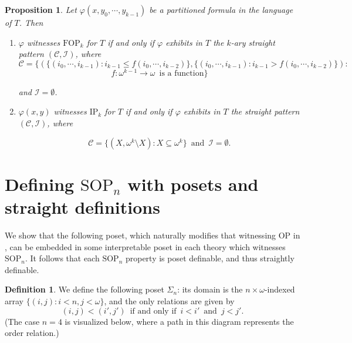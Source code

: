 \documentclass{article}
\newcommand{\calC}{\mathcal{C}}
\newcommand{\calI}{\mathcal{I}}
\newcommand{\SOP}{\text{SOP}}
\newcommand{\SOPn}{$\text{SOP}_n$}
\newcommand{\IFF}{\enspace\text{if and only if}\enspace}
\newcommand{\vphi}{\varphi}
\newtheorem{proposition}{Proposition}
\theoremstyle{definition}
\newtheorem{definition}{Definition}
\theoremstyle{definition}
\theoremstyle{definition}
\begin{document}
\begin{proposition}\label{higher arity straight pattern examples proposition}
    Let $\vphi(x,y_0,\dotsm, y_{k-1})$ be a partitioned formula in the language of $T$. Then
    \begin{enumerate}
        \item $\vphi$ witnesses $\mathrm{FOP}_k$ for $T$ if and only if $\vphi$ exhibits in $T$ the $k$-ary straight pattern $(\calC,\calI)$, where  
        \[\calC=\{(\{(i_0,\dotsm, i_{k-1})\colon i_{k-1}\leq f(i_0,\dotsm, i_{k-2})\},\{(i_0,\dotsm, i_{k-1})\colon i_{k-1}> f(i_0,\dotsm, i_{k-2})\})\colon\]
        \[ f\colon\omega^{k-1}\to\omega\enspace\text{is a function}\}\]
        
        and $\calI=\emptyset$.

        \item $\vphi(x,y)$ witnesses $\mathrm{IP}_k$ for $T$ if and only if $\vphi$ exhibits in $T$ the straight pattern $(\calC,\calI)$, where  
        
        \[\calC=\{(X,\omega^k\setminus X)\colon X\subseteq \omega^k\}\enspace\text{and}\enspace\calI=\emptyset.\]
        
    \end{enumerate}
\end{proposition}




\section{Defining $\SOP_n$ with posets and straight definitions}\label{New results on SOPn}

We show that the following poset, which naturally modifies that witnessing OP in \cite{garcia2022model}, can be embedded in some interpretable poset in each theory which witnesses \SOPn. It follows that each $\SOP_n$ property is poset definable, and thus straightly definable.

\begin{definition}
    We define the following poset $\Sigma_n$: its domain is the $n\times \omega$-indexed array $\{(i,j)\colon i<n, j<\omega\}$, and the only relations are given by \[(i,j)<(i', j') \IFF i<i' \enspace\text{and}\enspace j<j'.\] (The case $n=4$ is visualized below, where a path in this diagram represents the order relation.)
\end{definition}
\end{document}
